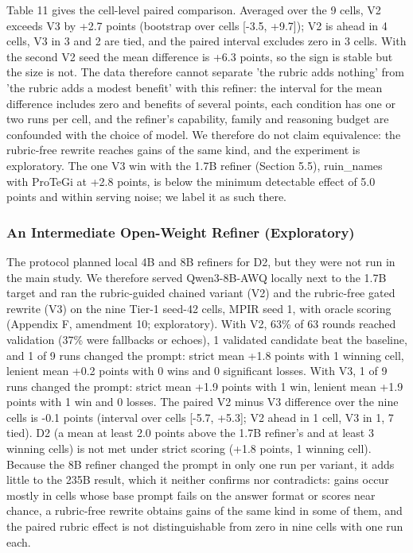 \documentclass{ieeeaccess}
\begin{document}
Table 11 gives the cell-level paired comparison. Averaged over the 9 cells, V2 exceeds V3 by +2.7 points (bootstrap over cells [-3.5, +9.7]); V2 is ahead in 4 cells, V3 in 3 and 2 are tied, and the paired interval excludes zero in 3 cells. With the second V2 seed the mean difference is +6.3 points, so the sign is stable but the size is not. The data therefore cannot separate 'the rubric adds nothing' from 'the rubric adds a modest benefit' with this refiner: the interval for the mean difference includes zero and benefits of several points, each condition has one or two runs per cell, and the refiner's capability, family and reasoning budget are confounded with the choice of model. We therefore do not claim equivalence: the rubric-free rewrite reaches gains of the same kind, and the experiment is exploratory. The one V3 win with the 1.7B refiner (Section 5.5), ruin\_\allowbreak{}names with ProTeGi at +2.8 points, is below the minimum detectable effect of 5.0 points and within serving noise; we label it as such there.

\subsubsection{An Intermediate Open-Weight Refiner (Exploratory)}

The protocol planned local 4B and 8B refiners for D2, but they were not run in the main study. We therefore served Qwen3-8B-AWQ locally next to the 1.7B target and ran the rubric-guided chained variant (V2) and the rubric-free gated rewrite (V3) on the nine Tier-1 seed-42 cells, MPIR seed 1, with oracle scoring (Appendix F, amendment 10; exploratory). With V2, 63\% of 63 rounds reached validation (37\% were fallbacks or echoes), 1 validated candidate beat the baseline, and 1 of 9 runs changed the prompt: strict mean +1.8 points with 1 winning cell, lenient mean +0.2 points with 0 wins and 0 significant losses. With V3, 1 of 9 runs changed the prompt: strict mean +1.9 points with 1 win, lenient mean +1.9 points with 1 win and 0 losses. The paired V2 minus V3 difference over the nine cells is -0.1 points (interval over cells [-5.7, +5.3]; V2 ahead in 1 cell, V3 in 1, 7 tied). D2 (a mean at least 2.0 points above the 1.7B refiner's and at least 3 winning cells) is not met under strict scoring (+1.8 points, 1 winning cell). Because the 8B refiner changed the prompt in only one run per variant, it adds little to the 235B result, which it neither confirms nor contradicts: gains occur mostly in cells whose base prompt fails on the answer format or scores near chance, a rubric-free rewrite obtains gains of the same kind in some of them, and the paired rubric effect is not distinguishable from zero in nine cells with one run each.
\end{document}
